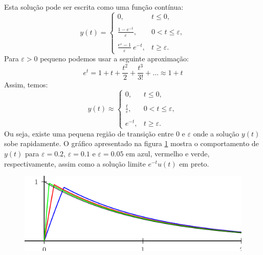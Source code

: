 \documentclass[a4paper,10pt]{book}
\begin{document}
Esta solução pode ser escrita como uma função contínua:
\begin{equation}y(t)=\left\{\begin{array}{ll}
0,&t\leq 0,\\~\\
\frac{1-e^{-t}}{\varepsilon},&0<t\leq \varepsilon,\\~\\
\frac{e^{\varepsilon}-1}{\varepsilon}~\!
e^{-t},&t\geq \varepsilon.
\end{array}
\right.\end{equation}
Para $\varepsilon>0$ pequeno podemos usar a seguinte aproximação:
\begin{equation}e^t=1+t+\frac{t^2}{2}+\frac{t^3}{3!}+\ldots \approx 1+t\end{equation}
Assim, temos:
\begin{equation}y(t)\approx\left\{\begin{array}{ll}
0,&t\leq 0,\\~\\
\frac{t}{\varepsilon},&0<t\leq \varepsilon,\\~\\
e^{-t},&t\geq \varepsilon.
\end{array}
\right.\end{equation}
Ou seja, existe uma pequena região de transição entre $0$ e $\varepsilon$ onde a solução $y(t)$ sobe rapidamente. O gráfico apresentado na figura \ref{concentracao_2} mostra o comportamento de $y(t)$ para $\varepsilon=0.2$, $\varepsilon=0.1$ e $\varepsilon=0.05$ em azul, vermelho e verde, respectivamente, assim como a solução limite $e^{-t}u(t)$ em preto.
\begin{figure}[!ht]
\begin{center}

\includegraphics{figs/figura_dirac_13} \end{center}
\caption{\label{concentracao_2}}
 \end{figure}
 

\end{document}
